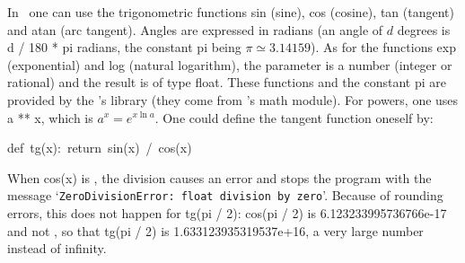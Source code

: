 {\begin{minipage}{\myparboxwidth}
 In \python\ one can use the trigonometric functions {\idt sin} (sine),
 {\idt cos} (cosine), {\idt tan} (tangent) and {\idt atan} (arc tangent). Angles are expressed in
 radians (an angle of $d$ degrees is {\idt d / 180 * pi} radians, the constant {\idt pi}
 being $\pi \simeq 3.14159$). As for the
 functions {\idt exp} (exponential) and
 {\idt log} (natural logarithm), the
  parameter is a number (integer or rational) and the
result is of type {\idt float}. These functions and the constant {\idt pi} are provided by the
\robot's library (they come from \python's {\idt math} module). For powers, one uses
 {\idt a ** x}, which is $a^{x} = e^{x \ln a}$. One could define the tangent function oneself by:

{
\parindent {}
\medskip
\mbox{\blc  \blk\idt  \mcl def\idt \ tg(x):\ \mcl return\idt \ sin(x)\ /\ cos(x)}\par
}

\noindent When {\idt cos(x)} is {}, the division causes an error and
stops the program with the message `{\tt ZeroDivisionError:\ float division by zero}'.
Because of rounding errors, this does not happen for
{\idt tg(pi / 2)}: {\idt cos(pi / 2)} is {\idt 6.123233995736766e-17} and not {}, so
that {\idt tg(pi / 2)} is {\idt 1.633123935319537e+16}, a very large number instead of infinity.

\vspace{\abovedisplayskip}
\end{minipage}
}

